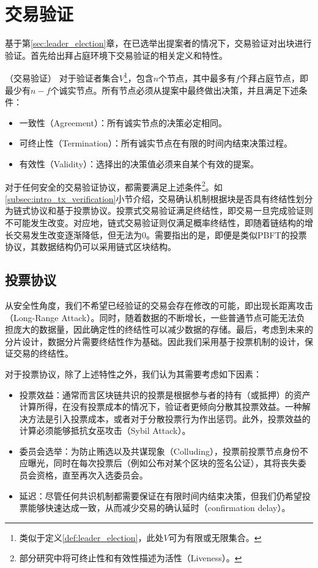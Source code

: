 \section{交易验证}
基于第\ref{sec:leader_election}章，在已选举出提案者的情况下，交易验证对出块进行验证。首先给出拜占庭环境下交易验证的相关定义和特性。

\begin{definition}
（交易验证） 对于验证者集合$V$\footnote{类似于定义\ref{def:leader_election}，此处$V$可为有限或无限集合。}，包含$n$个节点，其中最多有$f$个拜占庭节点，即最少有$n-f$个诚实节点。所有节点必须从提案中最终做出决策，并且满足下述条件：
\begin{itemize}
	\item 一致性（Agreement）：所有诚实节点的决策必定相同。
	\item 可终止性（Termination）：所有诚实节点在有限的时间内结束决策过程。
	\item 有效性（Validity）：选择出的决策值必须来自某个有效的提案。
\end{itemize}
\end{definition}

对于任何安全的交易验证协议，都需要满足上述条件\footnote{部分研究中将可终止性和有效性描述为活性（Liveness）。}。如\ref{subsec:intro_tx_verification}小节介绍，交易确认机制根据块是否具有终结性划分为链式协议和基于投票协议。投票式交易验证满足终结性，即交易一旦完成验证则不可能发生改变。对应地，链式交易验证则仅满足概率终结性，即随着链结构的增长交易发生改变逐渐降低，但无法为$0$。需要指出的是，即便是类似PBFT的投票协议，其数据结构仍可以采用链式区块结构。

\subsection{投票协议}
从安全性角度，我们不希望已经验证的交易会存在修改的可能，即出现长距离攻击（Long-Range Attack）。同时，随着数据的不断增长，一些普通节点可能无法负担庞大的数据量，因此确定性的终结性可以减少数据的存储。最后，考虑到未来的分片设计，数据分片需要终结性作为基础。因此我们采用基于投票机制的设计，保证交易的终结性。

对于投票协议，除了上述特性之外，我们认为其需要考虑如下因素：
\begin{itemize}
	\item 投票效益：通常而言区块链共识的投票是根据参与者的持有（或抵押）的资产计算所得，在没有投票成本的情况下，验证者更倾向分散其投票效益。一种解决方法是引入投票成本，或者对于分散投票行为作出惩罚\cite{buterin2017casper}。此外，投票效益的计算必须能够抵抗女巫攻击（Sybil Attack）。
	\item 委员会选举：为防止贿选以及共谋现象（Colluding），投票前投票节点身份不应曝光，同时在每次投票后（例如公布对某个区块的签名公证），其将丧失委员会资格，直至再次入选委员会。
	\item 延迟：尽管任何共识机制都需要保证在有限时间内结束决策，但我们仍希望投票能够快速达成一致，从而减少交易的确认延时（confirmation delay）。
\end{itemize}

